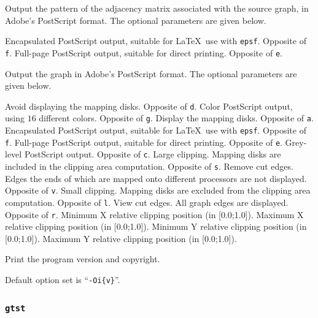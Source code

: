\begin{itemize}
\begin{itemize}
\begin{itemize}
\iteme[\texttt{m}]
Output the pattern of the adjacency matrix associated with the source graph,
in Adobe's PostScript format. The optional parameters are given below.
\begin{itemize}
\iteme[\texttt{e}]
Encapsulated PostScript output, suitable for \LaTeX\ use with \texttt{epsf}.
Opposite of \texttt{f}.
\iteme[\texttt{f}]
Full-page PostScript output, suitable for direct printing.
Opposite of \texttt{e}.
\end{itemize}
\iteme[\texttt{p}]
Output the graph in Adobe's PostScript format.
The optional parameters are given below.
\begin{itemize}
\iteme[\texttt{a}]
Avoid displaying the mapping disks. Opposite of \texttt{d}.
\iteme[\texttt{c}]
Color PostScript output, using $16$ different colors. Opposite of \texttt{g}.
\iteme[\texttt{d}]
Display the mapping disks. Opposite of \texttt{a}.
\iteme[\texttt{e}]
Encapsulated PostScript output, suitable for \LaTeX\ use with \texttt{epsf}.
Opposite of \texttt{f}.
\iteme[\texttt{f}]
Full-page PostScript output, suitable for direct printing.
Opposite of \texttt{e}.
\iteme[\texttt{g}]
Grey-level PostScript output. Opposite of \texttt{c}.
\iteme[\texttt{l}]
Large clipping. Mapping disks are included in the clipping area computation.
Opposite of \texttt{s}.
\iteme[\texttt{r}]
Remove cut edges. Edges the ends of which are mapped onto different
processors are not displayed.
Opposite of \texttt{v}.
\iteme[\texttt{s}]
Small clipping. Mapping disks are excluded from the clipping area computation.
Opposite of \texttt{l}.
\iteme[\texttt{v}]
View cut edges. All graph edges are displayed.
Opposite of \texttt{r}.
\iteme[\texttt{x=}{\it val}]
Minimum X relative clipping position (in [0.0;1.0]).
\iteme[\texttt{X=}{\it val}]
Maximum X relative clipping position (in [0.0;1.0]).
\iteme[\texttt{y=}{\it val}]
Minimum Y relative clipping position (in [0.0;1.0]).
\iteme[\texttt{Y=}{\it val}]
Maximum Y relative clipping position (in [0.0;1.0]).
\end{itemize}
\iteme[\texttt{-V}]
Print the program version and copyright.
\end{itemize}
\end{itemize}

Default option set is ``\texttt{-Oi\{v\}}''.
\end{itemize}

\subsubsection{\texttt{gtst}}

